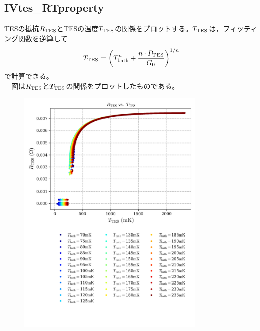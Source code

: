 \documentclass[platex,dvipdfmx,10pt,twoside,a4paper,jis2004]{jsarticle}
\begin{document}
\subsection*{IVtes\_RTproperty}
TESの抵抗$R_{\rm TES }$とTESの温度$T_{\rm TES}$の関係をプロットする。$T_{\rm TES}$は，フィッティング関数を逆算して
\[
T_{\rm TES} = \left(T_{\rm bath}^n + \frac{n\cdot P_{\rm TES}}{G_0}\right)^{1/n}
\]
で計算できる。\\　図は$R_{\rm TES }$と$T_{\rm TES}$の関係をプロットしたものである。
\begin{figure}[H]
    \centering
    \includegraphics[width=0.8\textwidth]{IVtes_RTproperty.png}
    \label{fig:IVtesRTproperty}
\end{figure}
\clearpage
\end{document}
